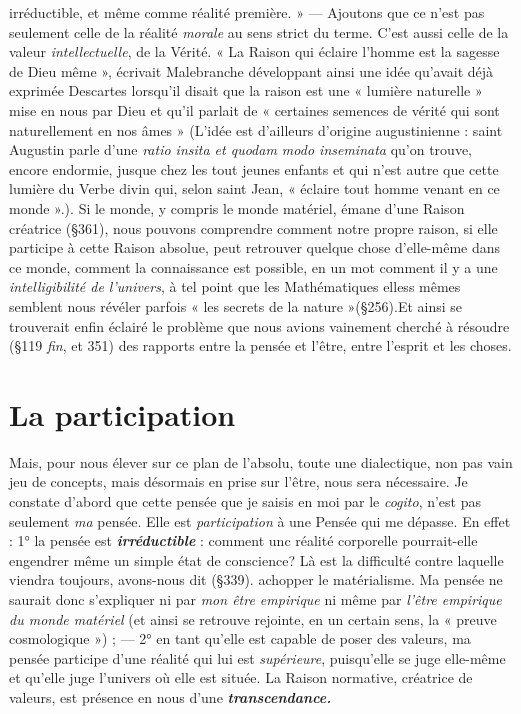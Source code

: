 irréductible, et même comme réalité première. » — Ajoutons que
ce n’est pas seulement celle de la réalité {\it morale} au sens
strict du terme. C’est aussi celle de la valeur {\it intellectuelle}, de la
Vérité. « La Raison qui éclaire l’homme est la sagesse de Dieu
même », écrivait Malebranche développant ainsi une idée qu'avait déjà exprimée
Descartes lorsqu'il disait que la raison est une « lumière naturelle »
mise en nous par Dieu et qu’il parlait de « certaines
semences de vérité qui sont naturellement en nos âmes »
{\footnotesize (L'idée est d’ailleurs d'origine augustinienne : saint Augustin parle d’une {\it ratio
insita et quodam modo inseminata} qu’on trouve, encore endormie, jusque chez les tout
jeunes enfants et qui n’est autre que cette lumière du Verbe divin qui, selon saint Jean,
« éclaire tout homme venant en ce monde ».)}.
Si le monde, y compris le monde matériel, émane d’une Raison
créatrice (\S 361), nous pouvons comprendre comment notre
propre raison, si elle participe à cette Raison absolue, peut
retrouver quelque chose d’elle-même dans ce monde, comment
la connaissance est possible, en un mot comment il y a une
{\it intelligibilité de l'univers}, à tel point que les Mathématiques
elless mêmes semblent nous révéler parfois « les secrets de la
nature »(\S 256).Et ainsi se trouverait enfin éclairé le problème
que nous avions vainement cherché à résoudre (\S 119 {\it fin},
et 351) des rapports entre la pensée et l’être, entre l'esprit
et les choses.
\section{La participation}%
Mais, pour nous élever sur ce plan
de l’absolu, toute une dialectique, non pas vain jeu de concepts, mais
désormais en prise sur l’être, nous sera nécessaire. Je constate d’abord
que cette pensée que je saisis en moi par le {\it cogito}, n’est pas seulement
{\it ma} pensée. Elle est {\it participation} à une Pensée qui me dépasse. En
effet : 1° la pensée est \textbf{\textit {irréductible}} : comment unc réalité corporelle
pourrait-elle engendrer même un simple état de conscience? Là est
la difficulté contre laquelle viendra toujours, avons-nous dit (\S 339).
achopper le matérialisme. Ma pensée ne saurait donc s’expliquer ni
par {\it mon être empirique} ni même par {\it l'être empirique du monde matériel}
(et ainsi se retrouve rejointe, en un certain sens, la « preuve cosmologique ») ;
— 2° en tant qu’elle est capable de poser des valeurs,
ma pensée participe d’une réalité qui lui est {\it supérieure}, puisqu’elle
se juge elle-même et qu’elle juge l’univers où elle est située. La Raison
normative, créatrice de valeurs, est présence en nous d’une
\textbf{\textit {transcendance.}}

